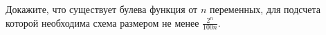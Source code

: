 Докажите, что существует булева функция от $n$ переменных, для подсчета которой необходима схема размером
не менее $\frac{2^n}{100n}$.
